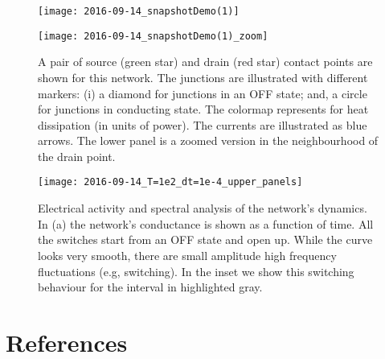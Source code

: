 \documentclass[preprint,10pt, authoryear, a4]{elsarticle}
\begin{document}
\begin{figure}
\begin{center}
\texttt{[image: 2016-09-14\_snapshotDemo(1)]}


\texttt{[image: 2016-09-14\_snapshotDemo(1)\_zoom]}
\caption{A pair of source (green star) and drain (red star) contact points are shown for this network.
The junctions are illustrated with different markers: (i) a diamond for junctions in an OFF state; and, a circle for junctions in conducting state. The colormap represents for heat dissipation (in units of power). The currents are illustrated as blue arrows. The lower panel is a zoomed version in the neighbourhood of the drain point.}
\label{fig:snapshots}
\end{center}
\end{figure}


\begin{sidewaysfigure}
\begin{center}
\texttt{[image: 2016-09-14\_T=1e2\_dt=1e-4\_upper\_panels]}
\caption{Electrical activity and spectral analysis of the network's dynamics.
In (a) the network's conductance is shown as a function of time. All the switches start from an OFF state and open up. While the curve looks very smooth, there are small amplitude high frequency fluctuations (e.g, switching). In the inset we show this switching behaviour for the interval in highlighted gray.
}
\label{fig:analysis}
\end{center}
\end{sidewaysfigure}

\pagebreak
\section{References}


\end{document}
